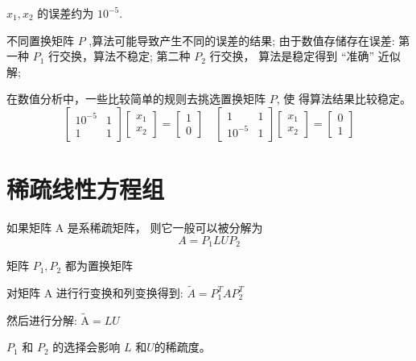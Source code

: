 \begin{example}
    \begin{remark}
        $ x_{1}, x_{2} $ 的误差约为 $ 10^{-5} $.
    \end{remark}

\end{example}


不同置换矩阵 $ P $ ,算法可能导致产生不同的误差的结果; 由于数值存储存在误差:
第一种 $ P_{1} $ 行交换，算法不稳定;
第二种 $ P_{2} $ 行交换， 算法是稳定得到 “准确” 近似解;

在数值分析中，一些比较简单的规则去挑选置换矩阵 $ P  $, 使 得算法结果比较稳定。
\begin{equation}
    \left[\begin{array}{cc}
            10^{-5} & 1 \\
            1       & 1
        \end{array}\right]\left[\begin{array}{l}
            x_{1} \\
            x_{2}
        \end{array}\right]=\left[\begin{array}{l}
            1 \\
            0
        \end{array}\right] \quad\left[\begin{array}{cc}
            1       & 1 \\
            10^{-5} & 1
        \end{array}\right]\left[\begin{array}{l}
            x_{1} \\
            x_{2}
        \end{array}\right]=\left[\begin{array}{l}
            0 \\
            1
        \end{array}\right]
\end{equation}





\section{稀疏线性方程组}

\begin{theorem}
    如果矩阵 $ \mathrm{A} $ 是系稀疏矩阵， 则它一般可以被分解为
    \begin{equation}
        A=P_{1} L U P_{2}
    \end{equation}

    矩阵 $ P_{1}, P_{2} $ 都为置换矩阵
\end{theorem}

\begin{corollary}
    对矩阵 $ \mathrm{A} $ 进行行变换和列变换得到: $ \tilde{A}=P_{1}^{T} A P_{2}^{T} $

    然后进行分解: $ \tilde{\mathrm{A}}=L U $
\end{corollary}



$ P_{1} $ 和 $ P_{2} $ 的选择会影响 $ {L} $ 和$U$的稀疏度。

